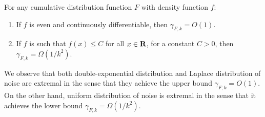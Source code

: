 \begin{lemma} For any cumulative distribution function $F$ with density function $f$: 
\begin{enumerate}
\item If $f$ is even and continuously differentiable, then $\gamma_{F,k} = O(1)$. 
\item If $f$ is such that $f(x) \leq C$ for all $x\in \mathbf{R}$, for a constant $C > 0$, then $\gamma_{F,k} = \Omega(1/k^2)$.
\end{enumerate}
\label{prop:gamma}
\end{lemma}

We observe that both double-exponential distribution and Laplace distribution of noise are extremal in the sense that they achieve the upper bound $\gamma_{F,k}=O(1)$. On the other hand, uniform distribution of noise is extremal in the sense that it achieves the lower bound $\gamma_{F,k}=\Omega(1/k^2)$. 






